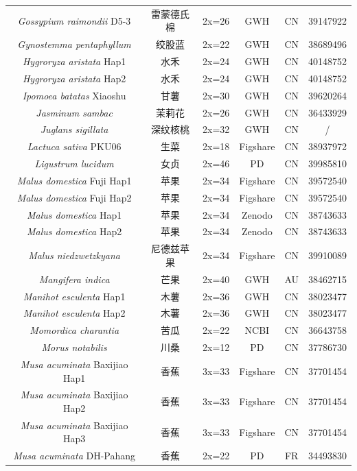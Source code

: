 {{\begin{longtable}{cccccc}
    \textit{Gossypium raimondii} D5-3 & 雷蒙德氏棉 & 2x=26 & GWH & CN & 39147922 \\
    \textit{Gynostemma pentaphyllum} & 绞股蓝 & 2x=22 & GWH & CN & 38689496 \\
    \textit{Hygroryza aristata} Hap1 & 水禾 & 2x=24 & GWH & CN & 40148752 \\
    \textit{Hygroryza aristata} Hap2 & 水禾 & 2x=24 & GWH & CN & 40148752 \\
    \textit{Ipomoea batatas} Xiaoshu & 甘薯 & 2x=30 & GWH & CN & 39620264 \\
    \textit{Jasminum sambac} & 茉莉花 & 2x=26 & GWH & CN & 36433929 \\
    \textit{Juglans sigillata} & 深纹核桃 & 2x=32 & GWH & CN & / \\
    \textit{Lactuca sativa} PKU06 & 生菜 & 2x=18 & Figshare & CN & 38937972 \\
    \textit{Ligustrum lucidum} & 女贞 & 2x=46 & PD & CN & 39985810 \\
    \textit{Malus domestica} Fuji Hap1 & 苹果 & 2x=34 & Figshare & CN & 39572540 \\
    \textit{Malus domestica} Fuji Hap2 & 苹果 & 2x=34 & Figshare & CN & 39572540 \\
    \textit{Malus domestica} Hap1 & 苹果 & 2x=34 & Zenodo & CN & 38743633 \\
    \textit{Malus domestica} Hap2 & 苹果 & 2x=34 & Zenodo & CN & 38743633 \\
    \textit{Malus niedzwetzkyana} & 尼德兹苹果 & 2x=34 & Figshare & CN & 39910089 \\
    \textit{Mangifera indica} & 芒果 & 2x=40 & GWH & AU & 38462715 \\
    \textit{Manihot esculenta} Hap1 & 木薯 & 2x=36 & GWH & CN & 38023477 \\
    \textit{Manihot esculenta} Hap2 & 木薯 & 2x=36 & GWH & CN & 38023477 \\
    \textit{Momordica charantia} & 苦瓜 & 2x=22 & NCBI & CN & 36643758 \\
    \textit{Morus notabilis} & 川桑 & 2x=12 & PD & CN & 37786730 \\
    \textit{Musa acuminata} Baxijiao Hap1 & 香蕉 & 3x=33 & Figshare & CN & 37701454 \\
    \textit{Musa acuminata} Baxijiao Hap2 & 香蕉 & 3x=33 & Figshare & CN & 37701454 \\
    \textit{Musa acuminata} Baxijiao Hap3 & 香蕉 & 3x=33 & Figshare & CN & 37701454 \\
    \textit{Musa acuminata} DH-Pahang & 香蕉 & 2x=22 & PD & FR & 34493830 \\

\end{longtable}}}
